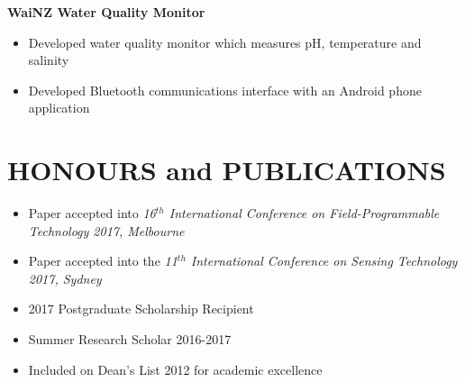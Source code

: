 \documentclass[3pt]{res}
\begin{document}
\begin{resume}
  {\bf WaiNZ Water Quality Monitor}
    \begin{itemize}[noitemsep] %
      \item Developed water quality monitor which measures pH, temperature and salinity
      \item Developed Bluetooth communications interface with an Android phone application
      \end{itemize}


\section{HONOURS and PUBLICATIONS}
\begin{itemize}[noitemsep]
    \item Paper accepted into \textit{16$^{th}$ International Conference on Field-Programmable Technology 2017, Melbourne}
    \item Paper accepted into the \textit{11$^{th}$ International Conference on Sensing Technology 2017, Sydney}
    \item 2017 Postgraduate Scholarship Recipient
    \item Summer Research Scholar 2016-2017
      \item Included on Dean's List 2012 for academic excellence
    \end{itemize}
\end{resume}
%
%
\end{document}
